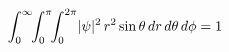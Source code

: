 \documentclass[preview]{standalone}
\begin{document}
\begin{align*}
\special{dvisvgm:raw <g id='unique000'>}\int_0^\infty\!\!\int_0^\pi\!\!\int_0^{2\pi}\lvert\psi\rvert^2\, r^2\sin\theta\,dr\,d\theta\,d\phi = 1\special{dvisvgm:raw </g>}
\end{align*}
\end{document}
